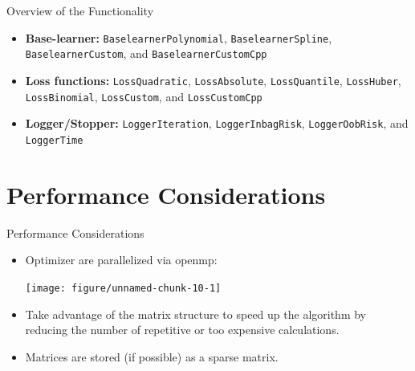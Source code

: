 \documentclass[10pt]{beamer}\usepackage[]{graphicx}\usepackage[]{color}
\newenvironment{knitrout}{}{} %
\begin{document}
\begin{frame}{Overview of the Functionality}

\begin{itemize}

  \item
    \textbf{Base-learner:} \texttt{BaselearnerPolynomial}, \texttt{BaselearnerSpline}, \texttt{BaselearnerCustom}, and \texttt{BaselearnerCustomCpp}

  \item
    \textbf{Loss functions:} \texttt{LossQuadratic}, \texttt{LossAbsolute}, \texttt{LossQuantile}, \texttt{LossHuber}, \texttt{LossBinomial}, \texttt{LossCustom}, and \texttt{LossCustomCpp}

  \item
    \textbf{Logger/Stopper:} \texttt{LoggerIteration}, \texttt{LoggerInbagRisk}, \texttt{LoggerOobRisk}, and \texttt{LoggerTime}

\end{itemize}

\end{frame}

\section{Performance Considerations}

\begin{frame}{Performance Considerations}


\begin{itemize}

  \item
    Optimizer are parallelized via openmp:\vspace{0.3cm}

\begin{knitrout}
\color{fgcolor}

{\centering \texttt{[image: figure/unnamed-chunk-10-1]} 

}



\end{knitrout}

  \item
    Take advantage of the matrix structure to speed up the algorithm by reducing the number of repetitive or too expensive calculations.

  \item
    Matrices are stored (if possible) as a sparse matrix.

\end{itemize}

\end{frame}
\end{document}
